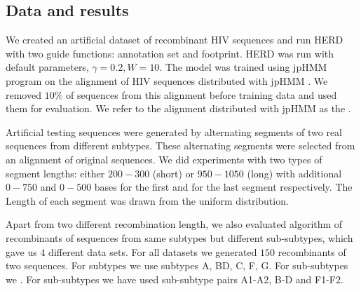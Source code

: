 \subsection{Data and results}
We created an artificial dataset of recombinant HIV sequences and run HERD with
two guide functions: annotation set and footprint. HERD was run with default
parameters, $\gamma=0.2, W=10$. The model was trained using jpHMM program on
the alignment of HIV sequences distributed with jpHMM \cite{Schultz2006}. We
removed $10\%$ of sequences from this alignment before training data and used
them for evaluation. We refer to the alignment distributed with jpHMM as the
.

Artificial testing sequences were generated by alternating segments of two real
sequences from different subtypes.  These alternating segments were selected
from an alignment of original sequences. We did experiments with two types of
segment lengths: either $200-300$ (short) or $950-1050$ (long) with additional
$0-750$ and $0-500$ bases for the first and for the last segment respectively.
The Length of each segment was drawn from the uniform distribution.

Apart from two different recombination length, we also evaluated algorithm of
recombinants of sequences from same subtypes but different sub-subtypes, which
gave us $4$ different data sets. For all datasets we generated $150$
recombinants of two sequences. For subtypes we use subtypes A, BD, C, F, G. For
sub-subtypes we . For sub-subtypes we have used sub-subtype pairs A1-A2, B-D and
F1-F2.

